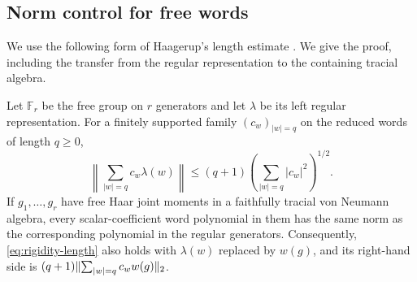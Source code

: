 \subsection{Norm control for free words}

We use the following form of Haagerup's length estimate
\cite[Lemma~1.4]{Haagerup1979}.  We give the proof, including the transfer
from the regular representation to the containing tracial algebra.

\begin{lemma}\label{lem:rigidity-length}
Let $\mathbb F_r$ be the free group on $r$ generators and let $\lambda$
be its left regular representation.  For a finitely supported family
$(c_w)_{|w|=q}$ on the reduced words of length $q\geq0$,
\begin{equation}\label{eq:rigidity-length}
 \left\|\sum_{|w|=q}c_w\lambda(w)\right\|
 \leq(q+1)\left(\sum_{|w|=q}|c_w|^2\right)^{1/2}.
\end{equation}
If $g_1,\ldots,g_r$ have free Haar joint moments in a faithfully tracial
von Neumann algebra, every scalar-coefficient word polynomial in them
has the same norm as the corresponding polynomial in the regular
generators.  Consequently, \eqref{eq:rigidity-length} also holds with
$\lambda(w)$ replaced by $w(g)$, and its right-hand side is
$(q+1)\lVert\sum_{|w|=q}c_w w(g)\rVert_2$.
\end{lemma}

